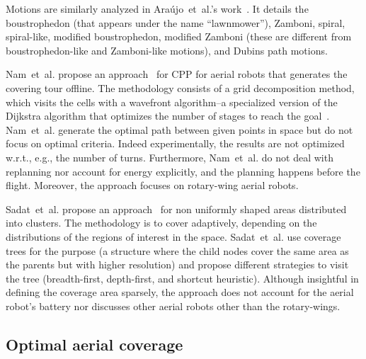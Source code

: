 Motions are similarly analyzed in Ara\'{u}jo~et~al.'s work~\citep{araujo2013multiple}. It details the boustrophedon (that appears under the name ``lawnmower''), Zamboni, spiral, spiral-like, modified boustrophedon, modified Zamboni (these are different from boustrophedon-like and Zamboni-like motions), and Dubins path motions.

Nam~et~al. propose an approach~\citep{nam2016approach} for CPP for aerial robots that generates the covering tour offline. The methodology consists of a grid decomposition method, which visits the cells with a wavefront algorithm--a specialized version of the Dijkstra algorithm that optimizes the number of stages to reach the goal~\citep{lavalle2006planning}. Nam~et~al. generate the optimal path between given points in space but do not focus on optimal criteria. Indeed experimentally, the results are not optimized w.r.t., e.g., the number of turns. Furthermore, Nam~et~al. do not deal with replanning nor account for energy explicitly, and the planning happens before the flight. Moreover, the approach focuses on rotary-wing aerial robots.


Sadat~et~al. propose an approach~\citep{sadat2014recursive} for non uniformly shaped areas distributed into clusters. The methodology is to cover adaptively, depending on the distributions of the regions of interest in the space. Sadat~et~al. use coverage trees for the purpose (a structure where the child nodes cover the same area as the parents but with higher resolution) and propose different strategies to visit the tree (breadth-first, depth-first, and shortcut heuristic). Although insightful in defining the coverage area sparsely, the approach does not account for the aerial robot's battery nor discusses other aerial robots other than the rotary-wings.

\subsection{Optimal aerial coverage}
\label{sec:opti-aero-cov}

